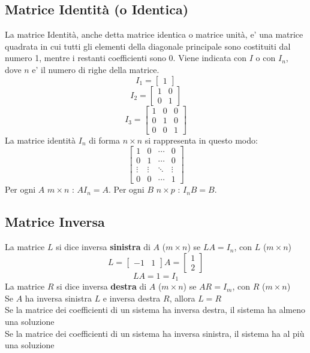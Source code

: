 \documentclass[a4paper, 10pt]{article}
\begin{document}
	\subsection{Matrice Identità (o Identica)}
	La matrice Identità, anche detta matrice identica o matrice unità, e' una matrice quadrata in cui tutti gli
	 elementi della
	diagonale principale sono costituiti dal numero 1, mentre i restanti coefficienti sono 0. Viene indicata con $I$ o 
	con $I_{n}$, dove $n$ e' il numero di righe della matrice.
		\[ I_1= \begin{bmatrix} 1 \end{bmatrix} \]
		\[ I_2 = \begin{bmatrix} 1 & 0 \\ 0 & 1 \end{bmatrix} \]
		\[ I_3 = \begin{bmatrix} 1 & 0 & 0 \\ 0 & 1 & 0 \\ 0 & 0 & 1 \end{bmatrix} \]
	La matrice identità $I_{n}$ di forma $n \times n$ si rappresenta in questo modo:
	\[
		\begin{bmatrix}
			1 & 0 & \cdots & 0 \\
			0 & 1 & \cdots & 0 \\
			\vdots & \vdots & \ddots & \vdots \\
			0 & 0 & \cdots & 1
		\end{bmatrix}
	\]
	Per ogni $A$ $m \times n$ : $AI_{n} = A$. Per ogni $B$ $n \times p$ : $I_{n}B = B$. 
	
	\subsection{Matrice Inversa}
	La matrice $L$ si dice inversa \textbf{sinistra} di $A$ ($m \times n$) se $LA = I_n$, con $L$ ($m \times n$)\\
		\[ L = \begin{bmatrix} -1 & 1 \end{bmatrix} A = \begin{bmatrix} 1 \\ 2 \end{bmatrix} \]
		\[ LA = 1 = I_{1} \]
	La matrice $R$ si dice inversa \textbf{destra} di $A$ ($m \times n$) se $AR = I_m$, con $R$ ($m \times n$)\\
	Se $A$ ha inversa sinistra $L$ e inversa destra $R$, allora $L = R$ \\
	Se la matrice dei coefficienti di un sistema ha inversa destra, il sistema ha almeno una soluzione \\
	Se la matrice dei coefficienti di un sistema ha inversa sinistra, il sistema ha al più una soluzione 
	
\end{document}
